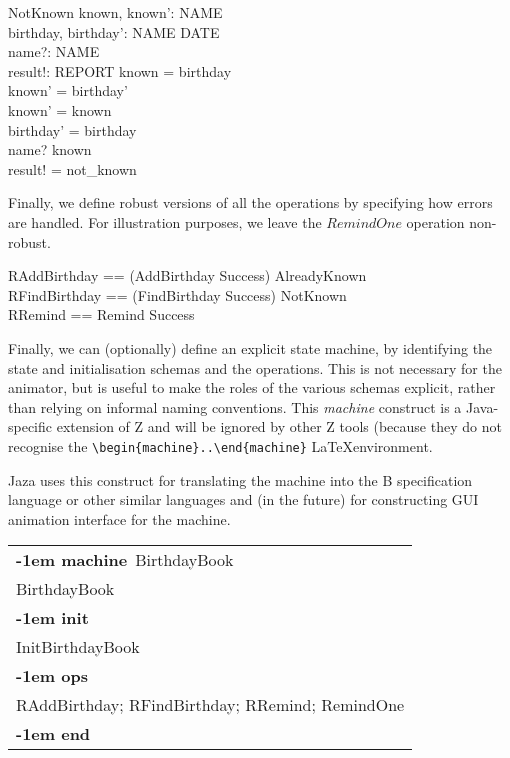 \documentclass{article}
\makeatletter
\newenvironment{machine}[1]{
    \begin{tabular}{@{\qquad}l}\textbf{\kern-1em machine}\ #1\\ }{
    \\ \textbf{\kern-1em end} \end{tabular} }
\newcommand{\machineInit}{\\ \textbf{\kern-1em init} \\}
\newcommand{\machineOps}{\\ \textbf{\kern-1em ops} \\}
\makeatother
\begin{document}
\begin{schema}{NotKnown}
    known, known': \power NAME \\
    birthday, birthday': NAME \pfun DATE \\
    name?: NAME \\
    result!: REPORT
\where
    known = \dom birthday \\
    known' = \dom birthday' \\
    known' = known \\
    birthday' = birthday \\
    name? \notin known \\
    result! = not\_known
\end{schema}

Finally, we define robust versions of all the operations
by specifying how errors are handled.  
For illustration purposes, we leave the $RemindOne$ operation non-robust.

\begin{zed} 
    RAddBirthday == (AddBirthday \land Success) \lor AlreadyKnown \\
    RFindBirthday == (FindBirthday \land Success) \lor NotKnown \\
    RRemind == Remind \land Success
\end{zed}

Finally, we can (optionally) define an explicit state machine,
by identifying the state and initialisation schemas and the
operations.  This is not necessary for the animator, but is
useful to make the roles of the various schemas explicit, rather
than relying on informal naming conventions.  
This \emph{machine} construct is a Java-specific extension of Z
and will be ignored by other Z tools (because they do not
recognise the \verb!\begin{machine}..\end{machine}! \LaTeX environment.

Jaza uses this construct for translating the machine into the B
specification language or other similar languages and (in the future) for
constructing GUI animation interface for the machine.


\begin{machine}{BirthdayBook}
  BirthdayBook
\machineInit
  InitBirthdayBook
\machineOps
    RAddBirthday; 
    RFindBirthday;
    RRemind;
    RemindOne
\end{machine}
\end{document}
